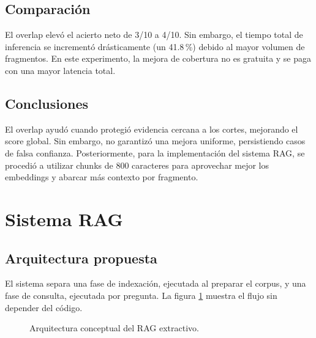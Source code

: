 \documentclass[12pt,letterpaper]{article}
\begin{document}
\subsection{Comparación}

El overlap elevó el acierto neto de 3/10 a 4/10. Sin embargo, el tiempo total de
inferencia se incrementó drásticamente (un 41.8\,\%) debido al mayor volumen
de fragmentos. En este experimento, la mejora de cobertura no es gratuita y se
paga con una mayor latencia total.

\subsection{Conclusiones}

El overlap ayudó cuando protegió evidencia cercana a los cortes, mejorando
el score global. Sin embargo, no garantizó una mejora uniforme, persistiendo
casos de falsa confianza. Posteriormente, para la implementación del sistema RAG,
se procedió a utilizar chunks de 800 caracteres para aprovechar mejor los embeddings
y abarcar más contexto por fragmento.

\section{Sistema RAG}

\subsection{Arquitectura propuesta}

El sistema separa una fase de indexación, ejecutada al preparar el corpus, y
una fase de consulta, ejecutada por pregunta. La figura
\ref{fig:arquitectura-rag} muestra el flujo sin depender del código.

\begin{figure}[!htbp]
\centering
{}
\caption{Arquitectura conceptual del RAG extractivo.}
\label{fig:arquitectura-rag}
\end{figure}
\end{document}
